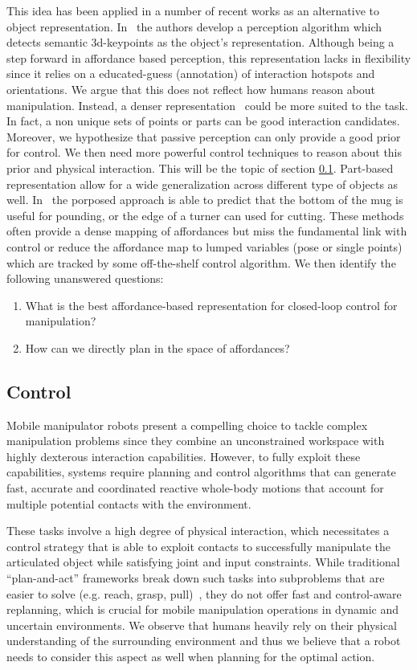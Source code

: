 This idea has been applied in a number of recent works as an alternative to object representation. In~\cite{gao2021kpam} the authors develop a perception algorithm which detects semantic 3d-keypoints as the object's representation. Although being a step forward in affordance based perception, this representation lacks in flexibility since it relies on a educated-guess (annotation) of interaction hotspots and orientations. We argue that this does not reflect how humans reason about manipulation. Instead, a denser representation~\cite{nagarajan2019grounded, mo2021where2act} could be more suited to the task. In fact, a non unique sets of points or parts can be good interaction candidates. Moreover, we hypothesize that passive perception can only provide a good prior for control. We then need more powerful control techniques to reason about this prior and physical interaction. This will be the topic of section \ref{sec:related_work_control}. Part-based representation allow for a wide generalization across different type of objects as well. In~\cite{myers2015affordance} the porposed approach is able to predict that the bottom of the mug is useful for pounding, or the edge of a turner can used for cutting. These methods often provide a dense mapping of affordances but miss the fundamental link with control or reduce the affordance map to lumped variables (pose or single points) which are tracked by some off-the-shelf control algorithm. We then identify the following unanswered questions:
\begin{enumerate}
\item What is the best affordance-based representation for closed-loop control for manipulation? 
\item How can we directly plan in the space of affordances?
\end{enumerate} 
 
\subsection{Control} \label{sec:related_work_control}
Mobile manipulator robots present a compelling choice to tackle complex manipulation problems since they combine an unconstrained workspace with highly dexterous interaction capabilities. However, to fully exploit these capabilities, systems require planning and control algorithms that can generate fast, accurate and coordinated reactive whole-body motions that account for multiple potential contacts with the environment. 

These tasks involve a high degree of physical interaction, which necessitates a control strategy that is able to exploit contacts to successfully manipulate the articulated object while satisfying joint and input constraints. While traditional ``plan-and-act'' frameworks break down such tasks into subproblems that are easier to solve (e.g. reach, grasp, pull)~\cite{Murali2020}, they do not offer fast and control-aware replanning, which is crucial for mobile manipulation operations in dynamic and uncertain environments. We observe that humans heavily rely on their physical understanding of the surrounding environment and thus we believe that a robot needs to consider this aspect as well when planning for the optimal action.

